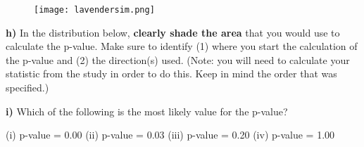 \documentclass[12pt, oneside]{article}
\newcommand{\noi}{\noindent}
\begin{document}
\begin{figure}[h!]
\centering
\texttt{[image: lavendersim.png]}
\end{figure}
\vspace{.05in}

\noi
{\bf h)} In the distribution below, {\bf clearly shade the area} that you would use to calculate the p-value. Make sure to identify (1) where you start the calculation of the p-value and (2) the direction(s) used. (Note: you will need to calculate your statistic from the study in order to do this. Keep in mind the order that was specified.)\\
\vspace{.5in}

\noi
{\bf i)} Which of the following is the most likely value for the p-value?
\begin{center}
(i) p-value = 0.00 \quad (ii) p-value = 0.03 \quad (iii) p-value = 0.20 \quad (iv) p-value = 1.00
\end{center}
\vspace{0.1in}
\end{document}
